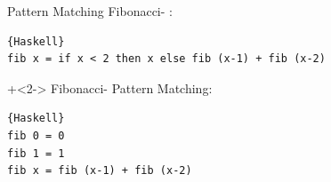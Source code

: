 \begin{frame}[fragile]{}

\begin{center}
\Large
{}
\end{center}

\end{frame}

\begin{frame}[fragile]{Pattern Matching}
Fibonacci- \glqq {}\grqq{}:
\begin{lstlisting}{Haskell}
fib x = if x < 2 then x else fib (x-1) + fib (x-2)
\end{lstlisting}

\onslide+<2->
\vfill
Fibonacci- Pattern Matching:
\begin{lstlisting}{Haskell}
fib 0 = 0
fib 1 = 1
fib x = fib (x-1) + fib (x-2)
\end{lstlisting}
\end{frame}

